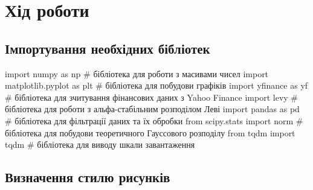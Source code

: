 \documentclass[
  letterpaper,
]{report}
\newenvironment{Shaded}{\begin{snugshade}}{\end{snugshade}}
\newcommand{\CommentTok}[1]{\textcolor[rgb]{0.37,0.37,0.37}{#1}}
\newcommand{\ImportTok}[1]{\textcolor[rgb]{0.00,0.46,0.62}{#1}}
\newcommand{\NormalTok}[1]{\textcolor[rgb]{0.00,0.23,0.31}{#1}}
\begin{document}
\hypertarget{ux445ux456ux434-ux440ux43eux431ux43eux442ux438-6}{%
\section{Хід
роботи}\label{ux445ux456ux434-ux440ux43eux431ux43eux442ux438-6}}

\hypertarget{ux456ux43cux43fux43eux440ux442ux443ux432ux430ux43dux43dux44f-ux43dux435ux43eux431ux445ux456ux434ux43dux438ux445-ux431ux456ux431ux43bux456ux43eux442ux435ux43a}{%
\subsection{Імпортування необхідних
бібліотек}\label{ux456ux43cux43fux43eux440ux442ux443ux432ux430ux43dux43dux44f-ux43dux435ux43eux431ux445ux456ux434ux43dux438ux445-ux431ux456ux431ux43bux456ux43eux442ux435ux43a}}

\begin{Shaded}
\begin{Highlighting}[]
\ImportTok{import}\NormalTok{ numpy }\ImportTok{as}\NormalTok{ np                 }\CommentTok{\# бібліотека для роботи з масивами чисел}
\ImportTok{import}\NormalTok{ matplotlib.pyplot }\ImportTok{as}\NormalTok{ plt    }\CommentTok{\# бібліотека для побудови графіків}
\ImportTok{import}\NormalTok{ yfinance }\ImportTok{as}\NormalTok{ yf              }\CommentTok{\# бібліотека для зчитування фінансових даних з Yahoo Finance}
\ImportTok{import}\NormalTok{ levy                        }\CommentTok{\# бібліотека для роботи з альфа{-}стабільним розподілом Леві}
\ImportTok{import}\NormalTok{ pandas }\ImportTok{as}\NormalTok{ pd                }\CommentTok{\# бібліотека для фільтрації даних та їх обробки}
\ImportTok{from}\NormalTok{ scipy.stats }\ImportTok{import}\NormalTok{ norm       }\CommentTok{\# бібліотека для побудови теоретичного Гауссового розподілу}
\ImportTok{from}\NormalTok{ tqdm }\ImportTok{import}\NormalTok{ tqdm              }\CommentTok{\# бібліотека для виводу шкали завантаження}
\end{Highlighting}
\end{Shaded}

\hypertarget{ux432ux438ux437ux43dux430ux447ux435ux43dux43dux44f-ux441ux442ux438ux43bux44e-ux440ux438ux441ux443ux43dux43aux456ux432}{%
\subsection{Визначення стилю
рисунків}\label{ux432ux438ux437ux43dux430ux447ux435ux43dux43dux44f-ux441ux442ux438ux43bux44e-ux440ux438ux441ux443ux43dux43aux456ux432}}
\end{document}
